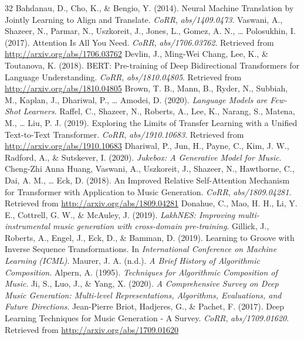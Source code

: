 \documentclass[sigconf]{nimeart}
\begin{document}
\begin{thebibliography}{32}
 {{ }}  Bahdanau, D., Cho, K., \& Bengio, Y. (2014). Neural Machine Translation by Jointly Learning to Align and Translate. \emph{CoRR}, \emph{abs/1409.0473}.{}
 {{ }}  Vaswani, A., Shazeer, N., Parmar, N., Uszkoreit, J., Jones, L., Gomez, A. N., \ldots{} Polosukhin, I. (2017). Attention Is All You Need. \emph{CoRR}, \emph{abs/1706.03762}. Retrieved from \url{http://arxiv.org/abs/1706.03762}{}
 {{ }}  Devlin, J., Ming-Wei Chang, Lee, K., \& Toutanova, K. (2018). BERT: Pre-training of Deep Bidirectional Transformers for Language Understanding. \emph{CoRR}, \emph{abs/1810.04805}. Retrieved from \url{http://arxiv.org/abs/1810.04805}{}
 {{ }}  Brown, T. B., Mann, B., Ryder, N., Subbiah, M., Kaplan, J., Dhariwal, P., \ldots{} Amodei, D. (2020). \emph{Language Models are Few-Shot Learners}.{}
 {{ }}  Raffel, C., Shazeer, N., Roberts, A., Lee, K., Narang, S., Matena, M., \ldots{} Liu, P. J. (2019). Exploring the Limits of Transfer Learning with a Unified Text-to-Text Transformer. \emph{CoRR}, \emph{abs/1910.10683}. Retrieved from \url{http://arxiv.org/abs/1910.10683}{}
 {{ }}  Dhariwal, P., Jun, H., Payne, C., Kim, J. W., Radford, A., \& Sutskever, I. (2020). \emph{Jukebox: A Generative Model for Music}.{}
 {{ }}  Cheng-Zhi Anna Huang, Vaswani, A., Uszkoreit, J., Shazeer, N., Hawthorne, C., Dai, A. M., \ldots{} Eck, D. (2018). An Improved Relative Self-Attention Mechanism for Transformer with Application to Music Generation. \emph{CoRR}, \emph{abs/1809.04281}. Retrieved from \url{http://arxiv.org/abs/1809.04281}{}
 {{ }}  Donahue, C., Mao, H. H., Li, Y. E., Cottrell, G. W., \& McAuley, J. (2019). \emph{LakhNES: Improving multi-instrumental music generation with cross-domain pre-training}.{}
 {{ }}  Gillick, J., Roberts, A., Engel, J., Eck, D., \& Bamman, D. (2019). Learning to Groove with Inverse Sequence Transformations. In \emph{International Conference on Machine Learning (ICML)}.{}
 {{ }}  Maurer, J. A. (n.d.). \emph{A Brief History of Algorithmic Composition}.{}
 {{ }}  Alpern, A. (1995). \emph{Techniques for Algorithmic Composition of Music}.{}
 {{ }}  Ji, S., Luo, J., \& Yang, X. (2020). \emph{A Comprehensive Survey on Deep Music Generation: Multi-level Representations, Algorithms, Evaluations, and Future Directions}.{}
 {{ }}  Jean-Pierre Briot, Hadjeres, G., \& Pachet, F. (2017). Deep Learning Techniques for Music Generation - A Survey. \emph{CoRR}, \emph{abs/1709.01620}. Retrieved from \url{http://arxiv.org/abs/1709.01620}{}

\end{thebibliography}
\end{document}
